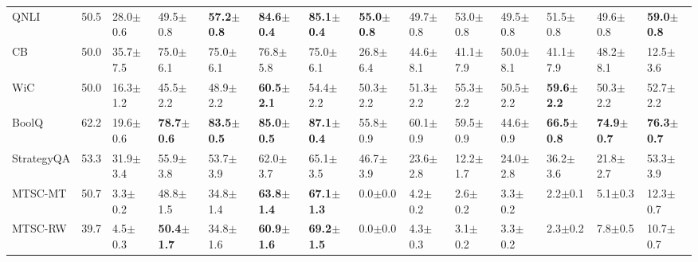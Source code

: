 \documentclass[letterpaper]{article} %
\begin{document}
\begin{table}[h!]
{\begin{tabular}{l||l|lllll||lllllll}
       QNLI &     50.5 &  28.0$\pm$0.6 &           49.5$\pm$0.8 &  \textbf{57.2$\pm$0.8} &  \textbf{84.6$\pm$0.4} &  \textbf{85.1$\pm$0.4} &  \textbf{55.0$\pm$0.8} &  49.7$\pm$0.8 &  53.0$\pm$0.8 &           49.5$\pm$0.8 &           51.5$\pm$0.8 &           49.6$\pm$0.8 &  \textbf{59.0$\pm$0.8} \\
         CB &     50.0 &  35.7$\pm$7.5 &           75.0$\pm$6.1 &           75.0$\pm$6.1 &           76.8$\pm$5.8 &           75.0$\pm$6.1 &           26.8$\pm$6.4 &  44.6$\pm$8.1 &  41.1$\pm$7.9 &           50.0$\pm$8.1 &           41.1$\pm$7.9 &           48.2$\pm$8.1 &           12.5$\pm$3.6 \\
        WiC &     50.0 &  16.3$\pm$1.2 &           45.5$\pm$2.2 &           48.9$\pm$2.2 &  \textbf{60.5$\pm$2.1} &           54.4$\pm$2.2 &           50.3$\pm$2.2 &  51.3$\pm$2.2 &  55.3$\pm$2.2 &           50.5$\pm$2.2 &  \textbf{59.6$\pm$2.2} &           50.3$\pm$2.2 &           52.7$\pm$2.2 \\
      BoolQ &     62.2 &  19.6$\pm$0.6 &  \textbf{78.7$\pm$0.6} &  \textbf{83.5$\pm$0.5} &  \textbf{85.0$\pm$0.5} &  \textbf{87.1$\pm$0.4} &           55.8$\pm$0.9 &  60.1$\pm$0.9 &  59.5$\pm$0.9 &           44.6$\pm$0.9 &  \textbf{66.5$\pm$0.8} &  \textbf{74.9$\pm$0.7} &  \textbf{76.3$\pm$0.7} \\\cline{1-1} \cline{2-4} \cline{8-9}
 StrategyQA &     53.3 &  31.9$\pm$3.4 &           55.9$\pm$3.8 &           \multicolumn{1}{|l}{53.7$\pm$3.9} &           62.0$\pm$3.7 &           65.1$\pm$3.5 &           46.7$\pm$3.9 &  23.6$\pm$2.8 &  \multicolumn{1}{|l}{12.2$\pm$1.7} &           24.0$\pm$2.8 &           36.2$\pm$3.6 &           21.8$\pm$2.7 &           53.3$\pm$3.9 \\
    MTSC-MT &     50.7 &   3.3$\pm$0.2 &           48.8$\pm$1.5 &           \multicolumn{1}{|l}{34.8$\pm$1.4} &  \textbf{63.8$\pm$1.4} &  \textbf{67.1$\pm$1.3} &            0.0$\pm$0.0 &   4.2$\pm$0.2 &   \multicolumn{1}{|l}{2.6$\pm$0.2} &            3.3$\pm$0.2 &            2.2$\pm$0.1 &            5.1$\pm$0.3 &           12.3$\pm$0.7 \\
    MTSC-RW &     39.7 &   4.5$\pm$0.3 &  \textbf{50.4$\pm$1.7} &           \multicolumn{1}{|l}{34.8$\pm$1.6} &  \textbf{60.9$\pm$1.6} &  \textbf{69.2$\pm$1.5} &            0.0$\pm$0.0 &   4.3$\pm$0.3 &   \multicolumn{1}{|l}{3.1$\pm$0.2} &            3.3$\pm$0.2 &            2.3$\pm$0.2 &            7.8$\pm$0.5 &           10.7$\pm$0.7 \\\cline{5-7} \cline{10-10}

\end{tabular}}
\end{table}
\end{document}
